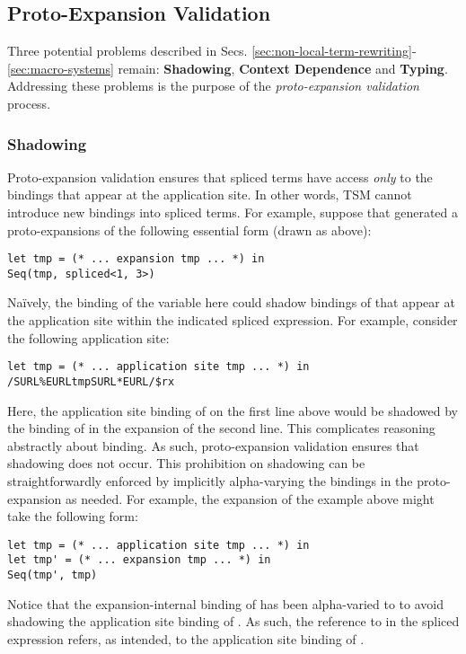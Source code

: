 \subsection{Proto-Expansion Validation}\label{sec:uetsms-validation}
Three potential problems described in Secs. \ref{sec:non-local-term-rewriting}-\ref{sec:macro-systems} remain: \textbf{Shadowing}, \textbf{Context Dependence} and \textbf{Typing}. Addressing these problems is the purpose of the \emph{proto-expansion validation} process.


\subsubsection{Shadowing}
Proto-expansion validation ensures that spliced terms have access \emph{only} to the bindings that appear at the application site. In other words, TSM cannot introduce new bindings into spliced terms. For example, suppose that   generated a proto-expansions of the following essential form (drawn as above):
\begin{lstlisting}[numbers=none]
let tmp = (* ... expansion tmp ... *) in 
Seq(tmp, spliced<1, 3>)
\end{lstlisting}
Na\"ively, the binding of the variable  here could shadow bindings of  that appear at the application site within the indicated spliced expression. For example, consider the following application site:
\begin{lstlisting}[numbers=none]
let tmp = (* ... application site tmp ... *) in 
/SURL%EURLtmpSURL*EURL/$rx
\end{lstlisting}
Here, the application site binding of  on the first line above would be shadowed by the binding of  in the expansion of the second line. This complicates reasoning abstractly about binding. As such, proto-expansion validation ensures that shadowing does not occur. This prohibition on shadowing can be straightforwardly enforced by implicitly alpha-varying the bindings in the proto-expansion as needed. For example, the expansion of the example above might take the following form:
\begin{lstlisting}[numbers=none]
let tmp = (* ... application site tmp ... *) in 
let tmp' = (* ... expansion tmp ... *) in 
Seq(tmp', tmp)
\end{lstlisting}
Notice that the expansion-internal binding of  has been alpha-varied to  to avoid shadowing the application site binding of . As such, the reference to  in the spliced expression refers, as intended, to the application site binding of .

